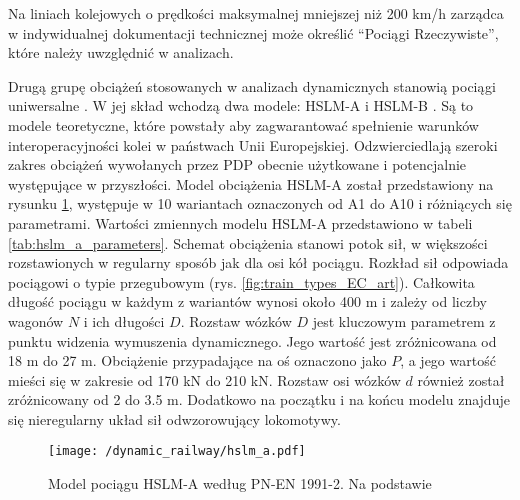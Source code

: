 Na liniach kolejowych o prędkości maksymalnej mniejszej niż 200 km/h zarządca w indywidualnej dokumentacji technicznej może określić \enquote{Pociągi Rzeczywiste}, które należy uwzględnić w analizach.





Drugą grupę obciążeń stosowanych w analizach dynamicznych stanowią pociągi uniwersalne . W jej skład wchodzą dwa modele: HSLM-A i HSLM-B . Są to modele teoretyczne, które powstały aby zagwarantować spełnienie warunków interoperacyjności kolei w państwach Unii Europejskiej. Odzwierciedlają szeroki zakres obciążeń wywołanych przez PDP obecnie użytkowane i potencjalnie występujące w przyszłości. Model obciążenia HSLM-A został przedstawiony na rysunku \ref{fig:train_hslm_a}, występuje w 10 wariantach oznaczonych od A1 do A10 i różniących się parametrami. Wartości zmiennych modelu HSLM-A przedstawiono w tabeli \ref{tab:hslm_a_parameters}. Schemat obciążenia stanowi potok sił, w większości rozstawionych w regularny sposób jak dla osi kół pociągu. Rozkład sił odpowiada pociągowi o typie przegubowym (rys. \ref{fig:train_types_EC_art}). Całkowita długość pociągu w każdym z wariantów wynosi około 400 m i zależy od liczby wagonów $N$ i ich długości $D$. Rozstaw wózków $D$ jest kluczowym parametrem z punktu widzenia wymuszenia dynamicznego. Jego wartość jest zróżnicowana od 18 m do 27 m. Obciążenie przypadające na oś oznaczono jako $P$, a jego wartość mieści się w zakresie od 170 kN do 210 kN. Rozstaw osi wózków $d$ również został zróżnicowany od 2 do 3.5 m. Dodatkowo na początku i na końcu modelu znajduje się nieregularny układ sił odwzorowujący lokomotywy. 

\begin{figure}[hbt!]
	\centering
	\texttt{[image: /dynamic\_railway/hslm\_a.pdf]}
	\captionsetup{justification=centering}
	\caption{Model pociągu HSLM-A według PN-EN 1991-2. Na podstawie \cite{PKNj}}
	\label{fig:train_hslm_a}
\end{figure}


